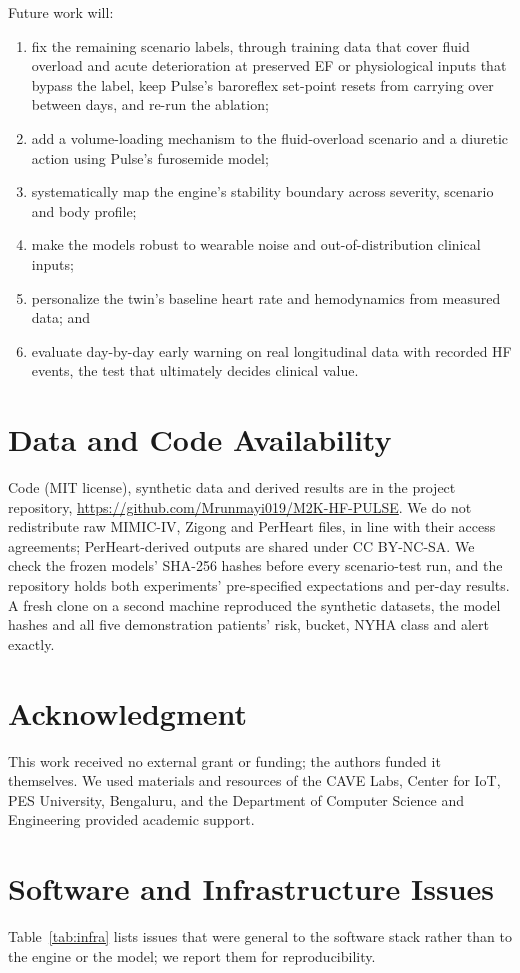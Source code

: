 \documentclass[conference]{IEEEtran}
\begin{document}
Future work will:
\begin{enumerate}
\item fix the remaining scenario labels, through training data that cover fluid overload and acute deterioration at preserved EF or physiological inputs that bypass the label, keep Pulse's baroreflex set-point resets from carrying over between days, and re-run the ablation;
\item add a volume-loading mechanism to the fluid-overload scenario and a diuretic action using Pulse's furosemide model;
\item systematically map the engine's stability boundary across severity, scenario and body profile;
\item make the models robust to wearable noise and out-of-distribution clinical inputs;
\item personalize the twin's baseline heart rate and hemodynamics from measured data; and
\item evaluate day-by-day early warning on real longitudinal data with recorded HF events, the test that ultimately decides clinical value.
\end{enumerate}

\section*{Data and Code Availability}
Code (MIT license), synthetic data and derived results are in the project repository, \url{https://github.com/Mrunmayi019/M2K-HF-PULSE}. We do not redistribute raw MIMIC-IV, Zigong and PerHeart files, in line with their access agreements; PerHeart-derived outputs are shared under CC BY-NC-SA. We check the frozen models' SHA-256 hashes before every scenario-test run, and the repository holds both experiments' pre-specified expectations and per-day results. A fresh clone on a second machine reproduced the synthetic datasets, the model hashes and all five demonstration patients' risk, bucket, NYHA class and alert exactly.

\section*{Acknowledgment}
This work received no external grant or funding; the authors funded it themselves. We used materials and resources of the CAVE Labs, Center for IoT, PES University, Bengaluru, and the Department of Computer Science and Engineering provided academic support.

\appendices
\section{Software and Infrastructure Issues}
Table~\ref{tab:infra} lists issues that were general to the software stack rather than to the engine or the model; we report them for reproducibility.
\end{document}
